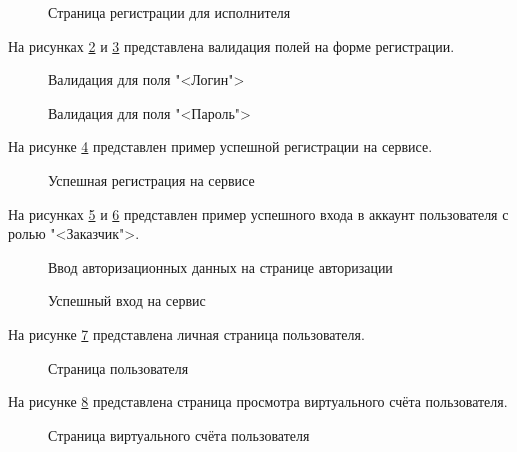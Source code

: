 \begin{figure}[ht]
	\caption{Страница регистрации для исполнителя}
	\label{t3:image}
\end{figure}

На рисунках \ref{t4:image} и \ref{t5:image} представлена валидация полей на форме регистрации.

\begin{figure}[ht]
\caption{Валидация для поля "<Логин">}
\label{t4:image}
\end{figure}
\clearpage

\begin{figure}[ht]
	\caption{Валидация для поля "<Пароль">}
	\label{t5:image}
\end{figure}

На рисунке \ref{t6:image} представлен пример успешной регистрации на сервисе.

\begin{figure}[ht]
	\caption{Успешная регистрация на сервисе}
	\label{t6:image}
\end{figure}

На рисунках \ref{t7:image} и \ref{t8:image} представлен пример успешного входа в аккаунт пользователя с ролью "<Заказчик">.

\begin{figure}[ht]
	\caption{Ввод авторизационных данных на странице авторизации}
	\label{t7:image}
\end{figure}

\begin{figure}[ht]
	\caption{Успешный вход на сервис}
	\label{t8:image}
\end{figure}
\clearpage

На рисунке \ref{t9:image} представлена личная страница пользователя.

\begin{figure}[ht]
	\caption{Страница пользователя}
	\label{t9:image}
\end{figure}

На рисунке \ref{t10:image} представлена страница просмотра виртуального счёта пользователя.

\begin{figure}[ht]
	\caption{Страница виртуального счёта пользователя}
	\label{t10:image}
\end{figure}

